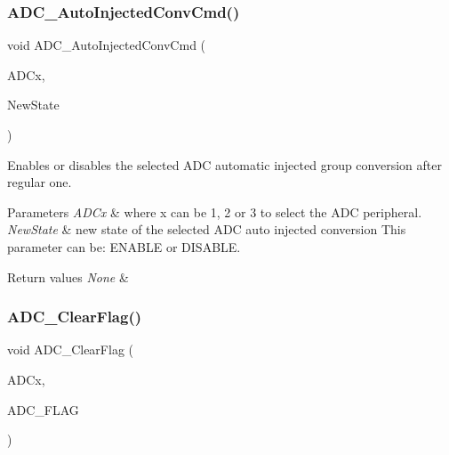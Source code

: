 \subsubsection{\texorpdfstring{ADC\_AutoInjectedConvCmd()}{ADC\_AutoInjectedConvCmd()}}
{\footnotesize\ttfamily void A\+D\+C\+\_\+\+Auto\+Injected\+Conv\+Cmd (\begin{DoxyParamCaption}\item[{\mbox{\hyperlink{struct_a_d_c___type_def}{A\+D\+C\+\_\+\+Type\+Def}} $\ast$}]{A\+D\+Cx,  }\item[{\mbox{\hyperlink{group___exported__types_gac9a7e9a35d2513ec15c3b537aaa4fba1}{Functional\+State}}}]{New\+State }\end{DoxyParamCaption})}



Enables or disables the selected A\+DC automatic injected group conversion after regular one. 


\begin{DoxyParams}{Parameters}
{\em A\+D\+Cx} & where x can be 1, 2 or 3 to select the A\+DC peripheral. \\
\hline
{\em New\+State} & new state of the selected A\+DC auto injected conversion This parameter can be\+: E\+N\+A\+B\+LE or D\+I\+S\+A\+B\+LE. \\
\hline
\end{DoxyParams}

\begin{DoxyRetVals}{Return values}
{\em None} & \\
\hline
\end{DoxyRetVals}
\mbox{\label{group___a_d_c___exported___functions_gaf34f36798f811b4a41321ea2d12118d4}} 
\subsubsection{\texorpdfstring{ADC\_ClearFlag()}{ADC\_ClearFlag()}}
{\footnotesize\ttfamily void A\+D\+C\+\_\+\+Clear\+Flag (\begin{DoxyParamCaption}\item[{\mbox{\hyperlink{struct_a_d_c___type_def}{A\+D\+C\+\_\+\+Type\+Def}} $\ast$}]{A\+D\+Cx,  }\item[{uint8\+\_\+t}]{A\+D\+C\+\_\+\+F\+L\+AG }\end{DoxyParamCaption})}



